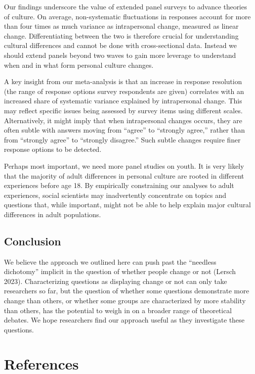 \documentclass[
  12pt,
]{article}
\begin{document}
Our findings underscore the value of extended panel surveys to advance
theories of culture. On average, non-systematic fluctuations in
responses account for more than four times as much variance as
intrapersonal change, measured as linear change. Differentiating between
the two is therefore crucial for understanding cultural differences and
cannot be done with cross-sectional data. Instead we should extend
panels beyond two waves to gain more leverage to understand when and in
what form personal culture changes.

A key insight from our meta-analysis is that an increase in response
resolution (the range of response options survey respondents are given)
correlates with an increased share of systematic variance explained by
intrapersonal change. This may reflect specific issues being assessed by
survey items using different scales. Alternatively, it might imply that
when intrapersonal changes occurs, they are often subtle with answers
moving from ``agree'' to ``strongly agree,'' rather than from ``strongly
agree'' to ``strongly disagree.'' Such subtle changes require finer
response options to be detected.

Perhaps most important, we need more panel studies on youth. It is very
likely that the majority of adult differences in personal culture are
rooted in different experiences before age 18. By empirically
constraining our analyses to adult experiences, social scientists may
inadvertently concentrate on topics and questions that, while important,
might not be able to help explain major cultural differences in adult
populations.

\hypertarget{conclusion}{%
\subsection{Conclusion}\label{conclusion}}

We believe the approach we outlined here can push past the ``needless
dichotomy'' implicit in the question of whether people change or not
(Lersch 2023). Characterizing questions as displaying change or not can
only take researchers so far, but the question of whether some questions
demonstrate more change than others, or whether some groups are
characterized by more stability than others, has the potential to weigh
in on a broader range of theoretical debates. We hope researchers find
our approach useful as they investigate these questions.

\theendnotes

\hypertarget{references}{%
\section{References}\label{references}}
\end{document}

